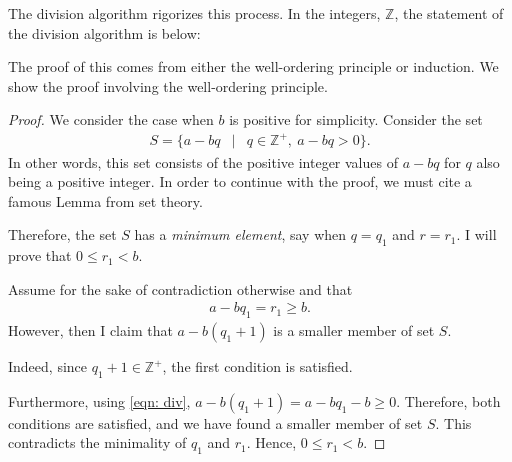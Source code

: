 \clearpage

The division algorithm rigorizes this process. In the integers, $\mathbb{Z}$, the statement of the division algorithm is below:


The proof of this comes from either the well-ordering principle or induction. We show the proof involving the well-ordering principle.

\begin{proof}

We consider the case when $b$ is positive for simplicity.  Consider the set \begin{eqnarray*} S=\{a-bq &|& q \in \mathbb{Z}^{+},\:a-bq>0\}. \end{eqnarray*}  
In other words, this set consists of the positive integer values of $a-bq$ for $q$ also being a positive integer.  In order to continue with the proof, we must cite a famous Lemma from set theory.  \cite{me:1} 


\clearpage

Therefore, the set $S$ has a \textit{minimum element}, say when $q=q_1$ and $r=r_1$. I will prove that $0\le r_1<b.$  

Assume for the sake of contradiction otherwise and that \begin{eqnarray} a-bq_1=r_1\ge b. \label{eqn: div} \end{eqnarray} However, then I claim that $a-b(q_1+1)$ is a smaller member of set $S$. 

Indeed, since $q_1+1\in \mathbb{Z}^{+}$, the first condition is satisfied.

Furthermore, using \ref{eqn: div}, $a-b(q_1+1)=a-bq_1-b\ge 0$. Therefore, both conditions are satisfied, and we have found a smaller member of set $S$. This contradicts the minimality of $q_1$ and $r_1$.  Hence, $0\le r_1<b$.   \end{proof}

